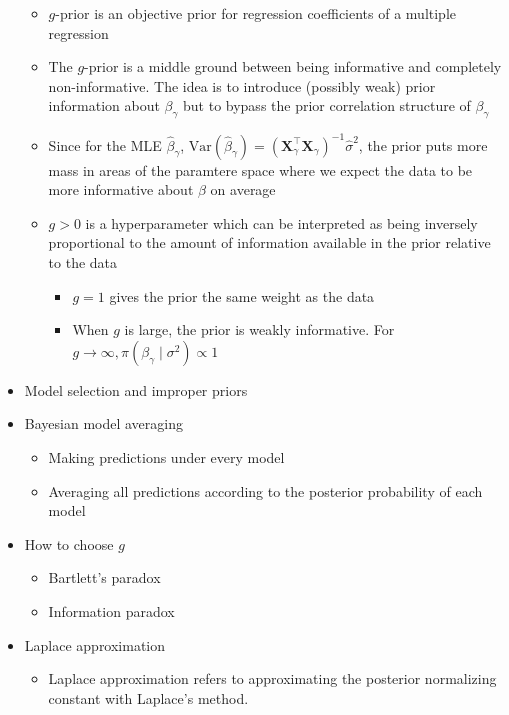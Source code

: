 \documentclass[a4paper]{article}
\begin{document}
\begin{itemize}
\begin{itemize}
        \item $g$-prior is an objective prior for regression coefficients of a multiple regression
        \item The $g$-prior is a middle ground between being informative and completely non-informative. The idea is to introduce (possibly weak) prior information about $\beta_{\gamma}$ but to bypass the prior correlation structure of $\beta_{\gamma}$
        \item Since for the MLE $\hat{\beta}_{\gamma}$, $\text{Var}(\hat{\beta}_{\gamma})=(\mathbf{X}_{\gamma}^{\intercal}\mathbf{X}_{\gamma})^{-1}\hat{\sigma}^2$, the prior puts more mass in areas of the paramtere space where we expect the data to be more informative about $\beta$ on average
        \item $g>0$ is a hyperparameter which can be interpreted as being inversely proportional to the amount of information available in the prior relative to the data
        \begin{itemize}
            \item $g=1$ gives the prior the same weight as the data
            \item When $g$ is large, the prior is weakly informative. For $g\to\infty, \pi(\beta_{\gamma}\mid\sigma^2)\propto 1$
        \end{itemize}
    \end{itemize}
    \item Model selection and improper priors
    \item Bayesian model averaging
    \begin{itemize}
        \item Making predictions under every model
        \item Averaging all predictions according to the posterior probability of each model
    \end{itemize}
    \item How to choose $g$
    \begin{itemize}
        \item Bartlett's paradox
        \item Information paradox
    \end{itemize}
    \item Laplace approximation
    \begin{itemize}
        \item Laplace approximation refers to approximating the posterior normalizing constant with Laplace's method.
    \end{itemize}

\end{itemize}
\end{document}
